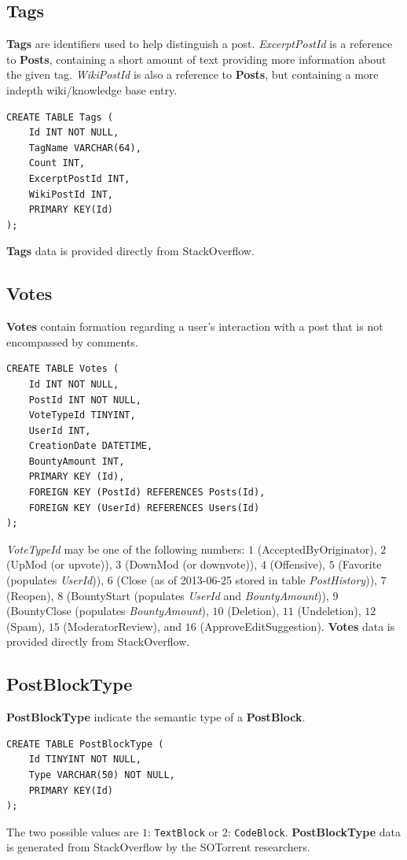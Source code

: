 \documentclass[a4paper,11pt, notitlepage]{report}
\theoremstyle{definition}
\numberwithin{equation}{section}		%
\begin{document}
\subsection{Tags}
\textbf{Tags} are identifiers used to help distinguish a post. \textit{ExcerptPostId} is a reference to \textbf{Posts}, containing a short amount of text providing more information about the given tag. \textit{WikiPostId} is also a reference to \textbf{Posts}, but containing a more indepth wiki/knowledge base entry.
\begin{lstlisting}
CREATE TABLE Tags (
    Id INT NOT NULL,
    TagName VARCHAR(64),
    Count INT,
    ExcerptPostId INT,
    WikiPostId INT,
    PRIMARY KEY(Id)
);
\end{lstlisting}
\textbf{Tags} data is provided directly from StackOverflow.

\subsection{Votes}
\textbf{Votes} contain formation regarding a user's interaction with a post that is not encompassed by comments.
\begin{lstlisting}
CREATE TABLE Votes (
    Id INT NOT NULL,
    PostId INT NOT NULL,
    VoteTypeId TINYINT,
    UserId INT,
    CreationDate DATETIME,
    BountyAmount INT,
    PRIMARY KEY (Id),
    FOREIGN KEY (PostId) REFERENCES Posts(Id),
    FOREIGN KEY (UserId) REFERENCES Users(Id)
);
\end{lstlisting}
\textit{VoteTypeId} may be one of the following numbers: $1$ (AcceptedByOriginator), $2$ (UpMod (or upvote)), $3$ (DownMod (or downvote)), $4$ (Offensive), $5$ (Favorite (populates \textit{UserId})), $6$ (Close (as of 2013-06-25 stored in table \textit{PostHistory})), $7$ (Reopen), $8$ (BountyStart (populates \textit{UserId} and \textit{BountyAmount})), $9$ (BountyClose (populates \textit{BountyAmount}), $10$ (Deletion), $11$ (Undeletion), $12$ (Spam), $15$ (ModeratorReview), and $16$ (ApproveEditSuggestion). \textbf{Votes} data is provided directly from StackOverflow.

\subsection{PostBlockType}
\textbf{PostBlockType} indicate the semantic type of a \textbf{PostBlock}.
\begin{lstlisting}
CREATE TABLE PostBlockType (
    Id TINYINT NOT NULL,
    Type VARCHAR(50) NOT NULL,
    PRIMARY KEY(Id)
);
\end{lstlisting}
The two possible values are $1$: \texttt{TextBlock} or $2$: \texttt{CodeBlock}. \textbf{PostBlockType} data is generated from StackOverflow by the SOTorrent researchers.
\end{document}
